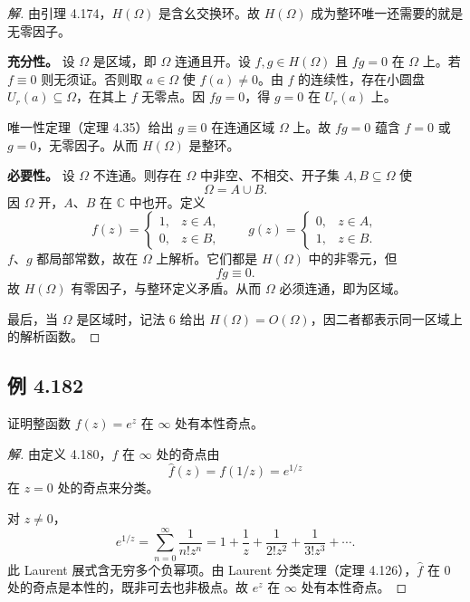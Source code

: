 \documentclass[11pt,a4paper]{article}
\newcommand{\C}{\mathbb{C}}
\theoremstyle{definition}
\newenvironment{solution}{\begin{proof}[解]}{\end{proof}}
\begin{document}
\begin{solution}
  由引理 4.174，$H(\Omega)$ 是含幺交换环。故 $H(\Omega)$ 成为整环唯一还需要的就是无零因子。

  \medskip
  \noindent\textbf{充分性。}
  设 $\Omega$ 是区域，即 $\Omega$ 连通且开。设 $f,g\in H(\Omega)$ 且 $fg=0$ 在 $\Omega$ 上。若 $f\equiv 0$ 则无须证。否则取 $a\in\Omega$ 使 $f(a)\ne 0$。由 $f$ 的连续性，存在小圆盘 $U_r(a)\subseteq \Omega$，在其上 $f$ 无零点。因 $fg=0$，得 $g=0$ 在 $U_r(a)$ 上。

  唯一性定理（定理 4.35）给出 $g\equiv 0$ 在连通区域 $\Omega$ 上。故 $fg=0$ 蕴含 $f=0$ 或 $g=0$，无零因子。从而 $H(\Omega)$ 是整环。

  \medskip
  \noindent\textbf{必要性。}
  设 $\Omega$ 不连通。则存在 $\Omega$ 中非空、不相交、开子集 $A,B\subseteq\Omega$ 使
  \[
    \Omega=A\cup B.
  \]
  因 $\Omega$ 开，$A$、$B$ 在 $\C$ 中也开。定义
  \[
    f(z)=
    \begin{cases}
      1,& z\in A,\\
      0,& z\in B,
    \end{cases}
    \qquad
    g(z)=
    \begin{cases}
      0,& z\in A,\\
      1,& z\in B.
    \end{cases}
  \]
  $f$、$g$ 都局部常数，故在 $\Omega$ 上解析。它们都是 $H(\Omega)$ 中的非零元，但
  \[
    fg\equiv 0.
  \]
  故 $H(\Omega)$ 有零因子，与整环定义矛盾。从而 $\Omega$ 必须连通，即为区域。

  最后，当 $\Omega$ 是区域时，记法 6 给出 $H(\Omega)=O(\Omega)$，因二者都表示同一区域上的解析函数。
\end{solution}

\subsection{例 4.182}

证明整函数 $f(z)=e^z$ 在 $\infty$ 处有本性奇点。

\begin{solution}
  由定义 4.180，$f$ 在 $\infty$ 处的奇点由
  \[
    \widehat f(z)=f(1/z)=e^{1/z}
  \]
  在 $z=0$ 处的奇点来分类。

  对 $z\ne 0$，
  \[
    e^{1/z}
    =
    \sum_{n=0}^{\infty}\frac{1}{n!z^n}
    =
    1+\frac1z+\frac{1}{2!z^2}+\frac{1}{3!z^3}+\cdots .
  \]
  此 Laurent 展式含无穷多个负幂项。由 Laurent 分类定理（定理 4.126），$\widehat f$ 在 $0$ 处的奇点是本性的，既非可去也非极点。故 $e^z$ 在 $\infty$ 处有本性奇点。
\end{solution}
\end{document}
